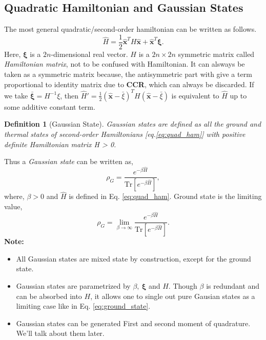 \documentclass[english,10pt,a4paper]{article}
\newtheorem{definition}{Definition}
\newcommand{\xx}{\hat{\textbf{x}}}
\newcommand{\ham}{\hat H}
\newcommand{\half}{\frac{1}{2}}
\newcommand{\tr}[1]{\text{Tr}\left[{#1}\right]}
\begin{document}
	\subsection{Quadratic Hamiltonian and Gaussian States}
	The most general quadratic/second-order hamiltonian can be written as follows.
	\begin{equation}
		\label{eq:quad_ham}
		\ham = \half \xx^T H \xx + \xx^T \mathbf{\xi}.
	\end{equation}
	Here, $\mathbf{\xi}$ is a $2n$-dimensional real vector. $H$ is a $2n\times 2n$ symmetric matrix called \textit{Hamiltonian matrix}, not to be confused with Hamiltonian. It can alsways be taken as  a symmetric matrix because, the antisymmetric part with give a term proportional to identity matrix due to \textbf{CCR}, which can always be discarded. If we take $\bar{\mathbf{\xi}}=H^{-1}\xi$, then $\hat{H}' = \half (\xx-\bar{\xi})^T H (\xx-\bar{\xi})$ is equivalent to $\hat{H}$ up to some additive constant term.
	\begin{definition}[Gaussian State]
		Gaussian states are defined as all the ground and thermal states of second-order Hamiltonians [eq.\ref{eq:quad_ham}] with positive definite Hamiltonian matrix H > 0.
	\end{definition}
	Thus a \textit{Gaussian state} can be written as,
	\begin{equation}
		\label{eq:gaussian_state}
		\rho_G = \frac{e^{-\beta \hat{H}}}{\tr{e^{-\beta \hat{H}}}},
	\end{equation}
	where, $\beta >0$ and $\hat{H}$ is defined in Eq. \ref{eq:quad_ham}. Ground state is the limiting value,
	\begin{equation}
		\label{eq:ground_state}
		\rho_G = \lim_{\beta\to \infty} \frac{e^{-\beta \hat{H}}}{\tr{e^{-\beta \hat{H}}}}.
	\end{equation}
	\textbf{Note:}
	\begin{itemize}
		\item All Gaussian states are mixed state by construction, except for the ground state.
		\item Gaussian states are parametrized by $\beta,\ \mathbf{\xi}$ and $H$. Though $\beta$ is redundant and can be absorbed into $H$, it allows one to single out pure Gausian states as a limiting case like in Eq. \ref{eq:ground_state}. 
		\item Gaussian states can be generated First and second moment of quadrature. We'll talk about them later.
	\end{itemize}
	
\end{document}
